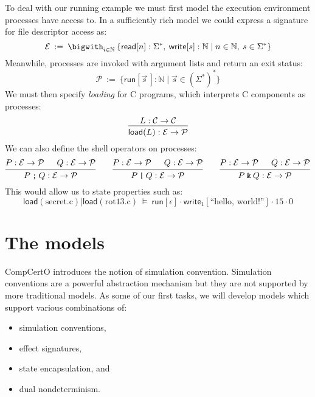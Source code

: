 \documentclass{report}
\begin{document}
To deal with our running example
we must first model the execution environment
processes have access to.
In a sufficiently rich model we could
express a signature for file descriptor access as:
\[
  \mathcal{E} \: := \:
    \bigwith_{i \in \mathbb{N}} \:
    \{
      \mathsf{read}[n] : \Sigma^* , \:
      \mathsf{write}[s] : \mathbb{N} \mid
      n \in \mathbb{N}, \:
      s \in \Sigma^*
    \}
\]
Meanwhile,
processes are invoked with argument lists and return an exit status:
\[ 
  \mathcal{P} \: := \:
    \{ \mathsf{run}[\vec{s}\,] : \mathbb{N} \mid
       \vec{s} \in (\Sigma^*)^* \}
\]
We must then specify \emph{loading} for C programs,
which interprets C components as processes:
\[
  \begin{prooftree}
    \hypo{L : \mathcal{C} \rightarrow \mathcal{C}}
    \infer1{\mathsf{load}(L) : \mathcal{E} \rightarrow \mathcal{P}}
  \end{prooftree}
\]
We can also define the shell operators on processes:
\[
  \begin{prooftree}
    \hypo{P : \mathcal{E} \rightarrow \mathcal{P}}
    \hypo{Q : \mathcal{E} \rightarrow \mathcal{P}}
    \infer2{P \mathbin\texttt{;} Q : \mathcal{E} \rightarrow \mathcal{P}}
  \end{prooftree}
  \qquad
  \begin{prooftree}
    \hypo{P : \mathcal{E} \rightarrow \mathcal{P}}
    \hypo{Q : \mathcal{E} \rightarrow \mathcal{P}}
    \infer2{P \mathbin\texttt{|} Q : \mathcal{E} \rightarrow \mathcal{P}}
  \end{prooftree}
  \qquad
  \begin{prooftree}
    \hypo{P : \mathcal{E} \rightarrow \mathcal{P}}
    \hypo{Q : \mathcal{E} \rightarrow \mathcal{P}}
    \infer2{P \mathbin\texttt{\&} Q : \mathcal{E} \rightarrow \mathcal{P}}
  \end{prooftree}
\]
This would allow us to state properties such as:
\[
  \mathsf{load}(\mathrm{secret.c})
  \mathbin{\texttt{|}}
  \mathsf{load}(\mathrm{rot13.c})
  \:\vDash\:
  \mathsf{run}[\epsilon] \cdot
  \mathsf{write}_1[\text{``hello, world!''}] \cdot
  15 \cdot
  0
\]


\section{The models} %

CompCertO introduces the notion of simulation convention.
Simulation conventions are a powerful abstraction mechanism
but they are not supported by more traditional models.
As some of our first tasks,
we will develop models which support various combinations of:
\begin{itemize}
  \item simulation conventions,
  \item effect signatures,
  \item state encapsulation, and
  \item dual nondeterminism.
\end{itemize}
\end{document}

